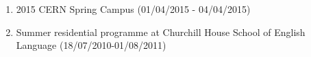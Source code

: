 \vspace{7pt}

\vspace{-9pt}
\begin{enumerate}
\itemsep0em 
\item 2015 CERN Spring Campus (01/04/2015 - 04/04/2015)
\item Summer residential programme at Churchill House School of English Language (18/07/2010-01/08/2011)
\end{enumerate}

